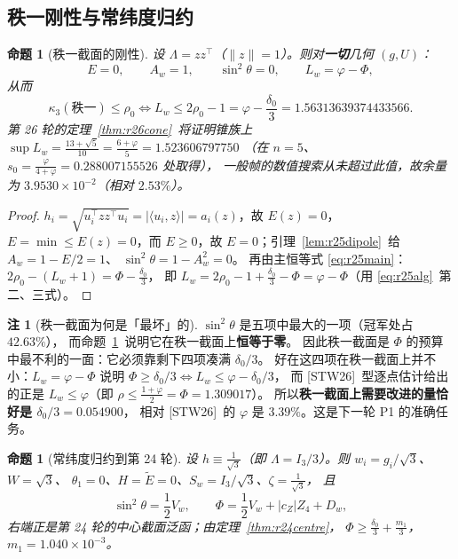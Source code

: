\documentclass[UTF8,11pt]{ctexart}
\newtheorem{proposition}[theorem]{命题}
\theoremstyle{definition}
\newtheorem{remark}[theorem]{注}
\newcommand{\Lam}{\Lambda}
\newcommand{\STW}{\textup{[STW26]}}
\begin{document}
\subsection{秩一刚性与常纬度归约}\label{sec:r25:rigid}

\begin{proposition}[秩一截面的刚性]\label{prop:r25rank1}
设 $\Lam=zz^\top$（$\|z\|=1$）。则对\textbf{一切}几何 $(g,U)$：
\begin{equation}\label{eq:r25r1}
E=0,\qquad A_w=1,\qquad \sin^2\theta=0,\qquad L_w=\varphi-\Phi ,
\end{equation}
从而
\begin{equation}\label{eq:r25r2}
\kappa_3(\text{秩一})\le\rho_0\iff
L_w\le2\rho_0-1=\varphi-\frac{\delta_0}3=1.56313639374433566 .
\end{equation}
第 26 轮的定理~\ref{thm:r26cone}~将证明锥族上
$\sup L_w=\frac{13+\sqrt5}{10}=\frac{6+\varphi}5=1.523606797750$
（在 $n=5$、$s_0=\frac{\varphi}{4+\varphi}=0.288007155526$ 处取得），
一般帧的数值搜索从未超过此值，故余量为 $3.9530\times10^{-2}$（相对 $2.53\%$）。
\end{proposition}

\begin{proof}
$h_i=\sqrt{u_i^\top zz^\top u_i}=|\langle u_i,z\rangle|=a_i(z)$，故 $E(z)=0$，
$E=\min\le E(z)=0$，而 $E\ge0$，故 $E=0$；引理~\ref{lem:r25dipole}~给 $A_w=1-E/2=1$、
$\sin^2\theta=1-A_w^2=0$。
再由主恒等式 \eqref{eq:r25main}：$2\rho_0-(L_w+1)=\Phi-\frac{\delta_0}3$，
即 $L_w=2\rho_0-1+\frac{\delta_0}3-\Phi=\varphi-\Phi$（用 \eqref{eq:r25alg}~第二、三式）。
\end{proof}

\begin{remark}[秩一截面为何是「最坏」的]\label{rem:r25rank1}
$\sin^2\theta$ 是五项中最大的一项（冠军处占 $42.63\%$），
而命题~\ref{prop:r25rank1}~说明它在秩一截面上\textbf{恒等于零}。
因此秩一截面是 $\Phi$ 的预算中最不利的一面：它必须靠剩下四项凑满 $\delta_0/3$。
好在这四项在秩一截面上并不小：$L_w=\varphi-\Phi$ 说明
$\Phi\ge\delta_0/3\iff L_w\le\varphi-\delta_0/3$，
而 \STW\ 型逐点估计给出的正是 $L_w\le\varphi$（即 $\rho\le\frac{1+\varphi}2=\Phi=1.309017$）。
所以\textbf{秩一截面上需要改进的量恰好是 $\delta_0/3=0.054900$}，
相对 \STW\ 的 $\varphi$ 是 $3.39\%$。这是下一轮 P1 的准确任务。
\end{remark}

\begin{proposition}[常纬度归约到第 24 轮]\label{prop:r25lat}
设 $h\equiv\frac1{\sqrt3}$（即 $\Lam=I_3/3$）。则 $w_i=g_i/\sqrt3$、$W=\sqrt3$、
$\theta_1=0$、$H=\widetilde E=0$、$S_w=I_3/\sqrt3$、$\zeta=\frac1{\sqrt3}$，
且
\begin{equation}\label{eq:r25lat}
\sin^2\theta=\frac12V_w,\qquad
\Phi=\frac12V_w+|c_Z|Z_4+D_w ,
\end{equation}
右端正是第 24 轮的中心截面泛函；由定理~\ref{thm:r24centre}，
$\Phi\ge\frac{\delta_0}3+\frac{m_1}3$，$m_1=1.040\times10^{-3}$。
\end{proposition}
\end{document}
